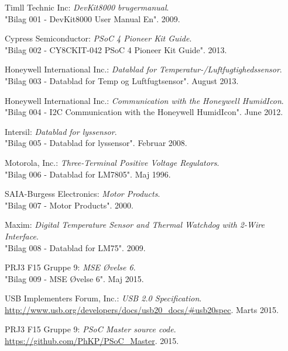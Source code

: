 \renewcommand{\bibname}{Litteraturliste}
\fancyhead[CE,CO]{}
\fancyfoot[CE,CO]{}
\begin{thebibliography}{2}

 Timll Technic Inc: \textit{DevKit8000 brugermanual}. \\ 
"Bilag 001 - DevKit8000 User Manual En". 2009.

 Cypress Semiconductor: \textit{PSoC 4 Pioneer Kit Guide}. \\
"Bilag 002 - CY8CKIT-042 PSoC 4 Pioneer Kit Guide". 2013.

 Honeywell International Inc.: \textit{Datablad for Temperatur-/Luftfugtighedssensor}. \\
"Bilag 003 - Datablad for Temp og Luftfugtsensor". August 2013.

 Honeywell International Inc.: \textit{\IIC Communication with the Honeywell HumidIcon}. \\
"Bilag 004 - I2C Communication with the Honeywell HumidIcon". June 2012.

 Intersil: \textit{Datablad for lyssensor}. \\
"Bilag 005 - Datablad for lyssensor". Februar 2008.

 Motorola, Inc.: \textit{Three-Terminal Positive Voltage Regulators}. \\
"Bilag 006 - Datablad for LM7805". Maj 1996.

 SAIA-Burgess Electronics: \textit{Motor Products}. \\
"Bilag 007 - Motor Products". 2000.

 Maxim: \textit{Digital Temperature Sensor and Thermal
Watchdog with 2-Wire Interface}. \\
"Bilag 008 - Datablad for LM75". 2009.

 PRJ3 F15 Gruppe 9: \textit{MSE Øvelse 6}. \\
"Bilag 009 - MSE Øvelse 6". Maj 2015. 

 USB Implementers Forum, Inc.: \textit{USB 2.0 Specification}.\\
\url{http://www.usb.org/developers/docs/usb20_docs/#usb20spec}. Marts 2015.

 PRJ3 F15 Gruppe 9: \textit{PSoC Master source code}. \\
\url{https://github.com/PhKP/PSoC_Master}. 2015.


\end{thebibliography}
